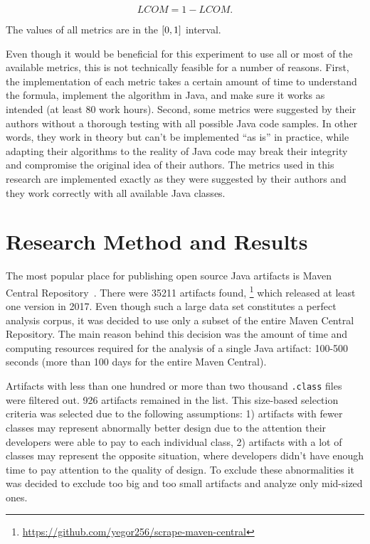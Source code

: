 \documentclass[conference]{IEEEtran}
\newcommand{\code}[1]{\texttt{#1}}
\begin{document}
\begin{equation}
\mathit{LCOM} = 1 - \mathit{LCOM}.
\end{equation}

The values of all metrics are in the $\interval{0}{1}$ interval.

Even though it would be beneficial for this experiment to use all or most
of the available metrics, this is not technically feasible for a number
of reasons. First, the implementation of each metric takes a certain amount of time to understand
the formula, implement the algorithm in Java, and make sure it works as intended
(at least 80 work hours).
Second, some metrics were suggested by their authors without a thorough testing
with all possible Java code samples. In other words, they work in theory
but can't be implemented ``as is'' in practice, while adapting their
algorithms to the reality of Java code may break their integrity and compromise the
original idea of their authors. The metrics used in this research are implemented
exactly as they were suggested by their authors and they work correctly with
all available Java classes.

\section{Research Method and Results}

The most popular place for publishing open source Java artifacts
is Maven Central Repository~\cite{miller10}.
There were 35211 artifacts found,%
\footnote{\url{https://github.com/yegor256/scrape-maven-central}}
which released at least one version in 2017.
Even though such a large data set constitutes a perfect analysis corpus,
it was decided to use only a subset of the entire Maven Central Repository.
The main reason behind this decision was the amount of time
and computing resources required for the analysis of a single
Java artifact: 100-500 seconds (more than 100 days for the entire Maven Central).

Artifacts with less than one hundred or more than two thousand
\code{.class} files were filtered out.
926 artifacts remained in the list.
This size-based selection criteria was selected due to the following
assumptions: 1) artifacts with fewer classes may represent
abnormally better design due to the attention their developers
were able to pay to each individual class, 2) artifacts with a lot
of classes may represent the opposite situation, where developers
didn't have enough time to pay attention to the quality of design.
To exclude these abnormalities it was decided to exclude too big
and too small artifacts and analyze only mid-sized ones.
\end{document}
